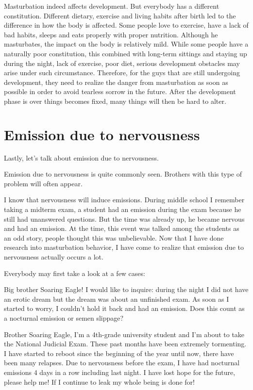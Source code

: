 \documentclass[
]{book}
\begin{document}
Masturbation indeed affects development. But everybody has a different constitution. Different dietary, exercise and living habits after birth led to the difference in how the body is affected. Some people love to exercise, have a lack of bad habits, sleeps and eats properly with proper nutrition. Although he masturbates, the impact on the body is relatively mild. While some people have a naturally poor constitution, this combined with long-term sittings and staying up during the night, lack of exercise, poor diet, serious development obstacles may arise under such circumstance. Therefore, for the guys that are still undergoing development, they need to realize the danger from masturbation as soon as possible in order to avoid tearless sorrow in the future. After the development phase is over things becomes fixed, many things will then be hard to alter.

\hypertarget{emission-due-to-nervousness}{%
\section{Emission due to nervousness}\label{emission-due-to-nervousness}}

Lastly, let's talk about emission due to nervousness.

Emission due to nervousness is quite commonly seen. Brothers with this type of problem will often appear.

I know that nervousness will induce emissions. During middle school I remember taking a midterm exam, a student had an emission during the exam because he still had unanswered questions. But the time was already up, he became nervous and had an emission. At the time, this event was talked among the students as an odd story, people thought this was unbelievable. Now that I have done research into masturbation behavior, I have come to realize that emission due to nervousness actually occurs a lot.

Everybody may first take a look at a few cases:

Big brother Soaring Eagle! I would like to inquire: during the night I did not have an erotic dream but the dream was about an unfinished exam. As soon as I started to worry, I couldn't hold it back and had an emission. Does this count as a nocturnal emission or semen slippage?

Brother Soaring Eagle, I'm a 4th-grade university student and I'm about to take the National Judicial Exam. These past months have been extremely tormenting. I have started to reboot since the beginning of the year until now, there have been many relapses. Due to nervousness before the exam, I have had nocturnal emissions 4 days in a row including last night. I have lost hope for the future, please help me! If I continue to leak my whole being is done for!
\end{document}
